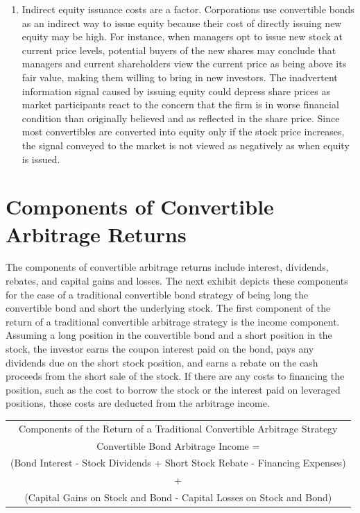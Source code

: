 \documentclass[11pt]{article}
\begin{document}
\begin{enumerate}
  \item Indirect equity issuance costs are a factor. Corporations use convertible bonds as an indirect way to issue equity because their cost of directly issuing new equity may be high. For instance, when managers opt to issue new stock at current price levels, potential buyers of the new shares may conclude that managers and current shareholders view the current price as being above its fair value, making them willing to bring in new investors. The inadvertent information signal caused by issuing equity could depress share prices as market participants react to the concern that the firm is in worse financial condition than originally believed and as reflected in the share price. Since most convertibles are converted into equity only if the stock price increases, the signal conveyed to the market is not viewed as negatively as when equity is issued.

\end{enumerate}

\section*{Components of Convertible Arbitrage Returns}
The components of convertible arbitrage returns include interest, dividends, rebates, and capital gains and losses. The next exhibit depicts these components for the case of a traditional convertible bond strategy of being long the convertible bond and short the underlying stock. The first component of the return of a traditional convertible arbitrage strategy is the income component. Assuming a long position in the convertible bond and a short position in the stock, the investor earns the coupon interest paid on the bond, pays any dividends due on the short stock position, and earns a rebate on the cash proceeds from the short sale of the stock. If there are any costs to financing the position, such as the cost to borrow the stock or the interest paid on leveraged positions, those costs are deducted from the arbitrage income.

\begin{center}
\begin{tabular}{c}
Components of the Return of a Traditional Convertible Arbitrage Strategy \\
Convertible Bond Arbitrage Income = \\
(Bond Interest - Stock Dividends + Short Stock Rebate - Financing Expenses) \\
\hline
+ \\
(Capital Gains on Stock and Bond - Capital Losses on Stock and Bond) \\
\end{tabular}
\end{center}
\end{document}
